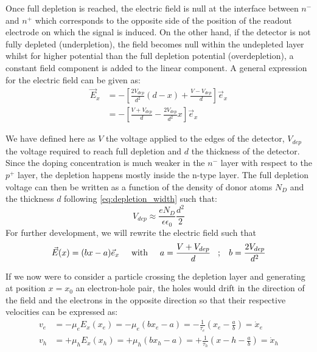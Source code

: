 		Once full depletion is reached, the electric field is null at the interface between $n^-$ and $n^+$ which corresponds to the opposite side of the position of the readout electrode on which the signal is induced. On the other hand, if the detector is not fully depleted (underpletion), the field becomes null within the undepleted layer whilst for higher potential than the full depletion potential (overdepletion), a constant field component is added to the linear component. A general expression for the electric field can be given as: 
		\begin{equation}
			\begin{split}
				\vec{E}_x &= - {\left[ \frac{2V_{dep}}{d^2} (d-x) + \frac{V-V_{dep}}{d} \right]} \vec{e}_x \\
									&=- {\left[ \frac{V + V_{dep}}{d} - \frac{2V_{dep}}{d^2}x \right]} \vec{e}_x 
			\end{split}
		\end{equation}

		We have defined here as $V$ the voltage applied to the edges of the detector, $V_{dep}$ the voltage required to reach full depletion and $d$ the thickness of the detector. Since the doping concentration is much weaker in the $n^-$ layer with respect to the $p^+$ layer, the depletion happens mostly inside the n-type layer. The full depletion voltage can then be written as a function of the density of donor atoms $N_D$ and the thickness $d$ following \eqref{eq:depletion_width} such that:
		\begin{equation}
			V_{dep} \approx \frac{eN_D}{\epsilon \epsilon_0}\frac{d^2}{2}
			\label{eq:depletion_voltage}
		\end{equation} 
		For further development, we will rewrite the electric field such that 
		\begin{equation}
			\vec{E}(x) = (bx-a)\vec{e}_x \hspace{5mm} \text{with} \hspace{5mm} a = \frac{V + V_{dep}}{d} \hspace{3mm} ; \hspace{3mm} b=\frac{2V_{dep}}{d^2}
		\end{equation}

		If we now were to consider a particle crossing the depletion layer and generating at position $x = x_0$ an electron-hole pair, the holes would drift in the direction of the field and the electrons in the opposite direction so that their respective velocities can be expressed as:
		\begin{equation}
			\begin{split}
				v_e &= -\mu_e E_x(x_e) = - \mu_e (bx_e-a) = - \frac{1}{\tau_e}{\left( x_e-\frac{a}{b} \right)} = \dot{x}_e \\
				v_h &= +\mu_h E_x(x_h) = + \mu_h (bx_h-a) = + \frac{1}{\tau_h}{\left( x-h-\frac{a}{b} \right)} = \dot{x}_h \\
			\end{split}
		\end{equation}

